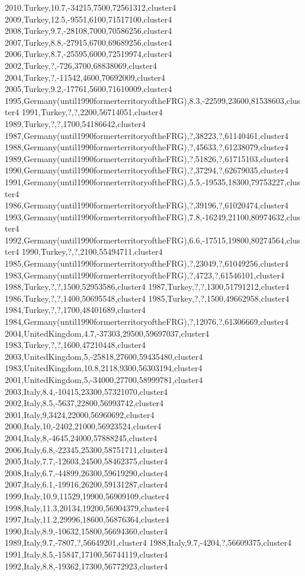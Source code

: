 2010,Turkey,10.7,-34215,7500,72561312,cluster4
2009,Turkey,12.5,-9551,6100,71517100,cluster4
2008,Turkey,9.7,-28108,7000,70586256,cluster4
2007,Turkey,8.8,-27915,6700,69689256,cluster4
2006,Turkey,8.7,-25595,6000,72519974,cluster4
2002,Turkey,?,-726,3700,68838069,cluster4
2004,Turkey,?,-11542,4600,70692009,cluster4
2005,Turkey,9.2,-17761,5600,71610009,cluster4
1995,Germany(until1990formerterritoryoftheFRG),8.3,-22599,23600,81538603,cluster4
1991,Turkey,?,?,2200,56714051,cluster4
1989,Turkey,?,?,1700,54186642,cluster4
1987,Germany(until1990formerterritoryoftheFRG),?,38223,?,61140461,cluster4
1988,Germany(until1990formerterritoryoftheFRG),?,45633,?,61238079,cluster4
1989,Germany(until1990formerterritoryoftheFRG),?,51826,?,61715103,cluster4
1990,Germany(until1990formerterritoryoftheFRG),?,37294,?,62679035,cluster4
1991,Germany(until1990formerterritoryoftheFRG),5.5,-19535,18300,79753227,cluster4
1986,Germany(until1990formerterritoryoftheFRG),?,39196,?,61020474,cluster4
1993,Germany(until1990formerterritoryoftheFRG),7.8,-16249,21100,80974632,cluster4
1992,Germany(until1990formerterritoryoftheFRG),6.6,-17515,19800,80274564,cluster4
1990,Turkey,?,?,2100,55494711,cluster4
1985,Germany(until1990formerterritoryoftheFRG),?,23049,?,61049256,cluster4
1983,Germany(until1990formerterritoryoftheFRG),?,4723,?,61546101,cluster4
1988,Turkey,?,?,1500,52953586,cluster4
1987,Turkey,?,?,1300,51791212,cluster4
1986,Turkey,?,?,1400,50695548,cluster4
1985,Turkey,?,?,1500,49662958,cluster4
1984,Turkey,?,?,1700,48401689,cluster4
1984,Germany(until1990formerterritoryoftheFRG),?,12076,?,61306669,cluster4
2004,UnitedKingdom,4.7,-37303,29500,59697037,cluster4
1983,Turkey,?,?,1600,47210448,cluster4
2003,UnitedKingdom,5,-25818,27600,59435480,cluster4
1983,UnitedKingdom,10.8,2118,9300,56303194,cluster4
2001,UnitedKingdom,5,-34000,27700,58999781,cluster4
2003,Italy,8.4,-10415,23300,57321070,cluster4
2002,Italy,8.5,-5637,22800,56993742,cluster4
2001,Italy,9,3424,22000,56960692,cluster4
2000,Italy,10,-2402,21000,56923524,cluster4
2004,Italy,8,-4645,24000,57888245,cluster4
2006,Italy,6.8,-22345,25300,58751711,cluster4
2005,Italy,7.7,-12603,24500,58462375,cluster4
2008,Italy,6.7,-44899,26300,59619290,cluster4
2007,Italy,6.1,-19916,26200,59131287,cluster4
1999,Italy,10.9,11529,19900,56909109,cluster4
1998,Italy,11.3,20134,19200,56904379,cluster4
1997,Italy,11.2,29996,18600,56876364,cluster4
1990,Italy,8.9,-10632,15800,56694360,cluster4
1989,Italy,9.7,-7807,?,56649201,cluster4
1988,Italy,9.7,-4204,?,56609375,cluster4
1991,Italy,8.5,-15847,17100,56744119,cluster4
1992,Italy,8.8,-19362,17300,56772923,cluster4
